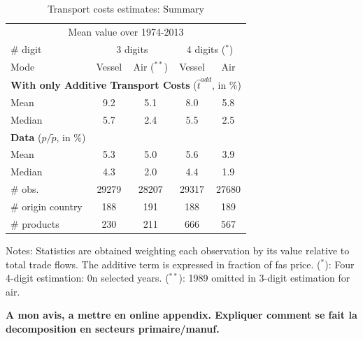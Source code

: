 \documentclass[11pt,twoside, authoryear]{elsarticle}
\begin{document}
\begin{table}[htbp]
  \centering
  \footnotesize{
  \caption{Transport costs estimates: Summary \label{sec_oa:add_only}}
  \begin{center}
    \begin{tabular}{l|cc|cc}
      \hline \hline
    \multicolumn{5}{c}{Mean value over 1974-2013}   \\
    \# digit & \multicolumn{2}{c}{3 digits} & \multicolumn{2}{c}{4 digits ($^\ast$)} \\ \hline
    Mode  & Vessel & Air ($^{\ast \ast}$) & Vessel & Air \\ \hline
    \multicolumn{5}{l}{\textbf{With only Additive Transport Costs} ($\widehat{t}^{add}$, in \%)}  \\ \hline
    Mean  & 9.2 & 5.1 & 8.0 & 5.8 \\
    Median & 5.7 & 2.4 & 5.5 & 2.5 \\ \hline

       \multicolumn{5}{l}{\textbf{Data} ($p/\widetilde{p}$, in \%) } \\ \hline
        Mean & 5.3 & 5.0& 5.6&3.9 \\
        Median & 4.3 & 2.0 & 4.4& 1.9 \\ \hline
        \# obs. & 29279 & 28207 & 29317 & 27680 \\
    \# origin country & 188 & 191 & 188 & 189 \\
    \# products & 230 & 211 & 666 & 567 \\  \hline \hline
  \end{tabular}
    \end{center}}
\parbox[l]{10cm}{\tiny{Notes: Statistics are obtained weighting each observation by its value relative to total trade flows. The additive term is expressed in fraction of fas price. ($^\ast$): Four 4-digit estimation: 0n selected years. ($^{\ast \ast}$): 1989 omitted in 3-digit estimation for air.}}
\end{table}%







%
%
%
%			
%			
%					
%
%
%


\textbf{A mon avis, a mettre en online appendix. Expliquer comment se fait la decomposition en secteurs primaire/manuf.}
\end{document}
